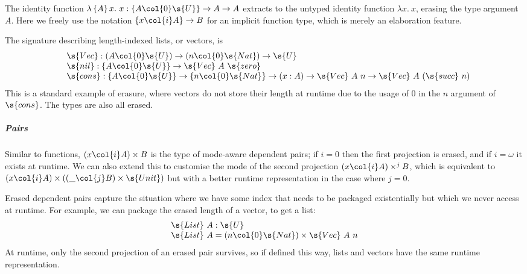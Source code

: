 \documentclass[a4paper,UKenglish,cleveref,autoref,thm-restate]{lipics-v2021}
\begin{document}
\begin{example}
 The identity function $\lambda \, \{A\} \, x.\ x : \{A \col{0} \s{U}\} \to A \to A$
  extracts to the untyped identity function $\lambda x.\ x$, erasing the type argument $A$.
  Here we freely use the notation $\{x \col{i} A\} \to B$ for an implicit
  function type, which is merely an elaboration feature.
\end{example}

\begin{example}\label{ex:vec}
The signature describing length-indexed lists, or vectors, is
\[\begin{array}{ll}
 & \s{Vec} : (A  \col{0} \s{U}) \to (n \col{0} \s{Nat}) \to \s{U} \\
 & \s{nil} : \{A  \col{0} \s{U}\} \to \s{Vec}\ A\ \s{zero} \\
 & \s{cons} : \{A \col{0} \s{U}\} \to \{n \col{0} \s{Nat}\} \to (x : A) \to \s{Vec}\ A\ n \to \s{Vec}\ A\ (\s{succ}\ n) \\
\end{array}\] This is a standard example of erasure, where vectors do not store
their length at runtime due to the usage of $0$ in the $n$ argument of
$\s{cons}$. The types are also all erased.
\end{example}

\subparagraph{Pairs}\label{ssub:dep-pairs} Similar to functions, $(x \col{i} A)
\times B$ is the type of mode-aware dependent pairs; if $i = 0$ then the
first projection is erased, and if $i = \omega$ it exists at runtime.  We can also extend this to customise the mode of
the second projection $(x \col{i} A) \times^{j} B$, which is equivalent to $(x
\col{i} A) \times ((\_ \col{j} B) \times \s{Unit})$ but with a better
runtime representation in the case where $j = 0$.

\begin{example}
Erased dependent pairs capture the situation where we have some index that needs
to be packaged existentially but which we never access at runtime. For example, we can
package the erased length of a vector, to get a list:
\[\begin{array}{l}
  \s{List}\ A: \s{U} \\
  \s{List}\ A = (n \col{0} \s{Nat}) \times \s{Vec}\ A\ n \end{array} \] At
runtime, only the second projection of an erased pair survives, so if defined
this way, lists and vectors have the same runtime representation.
\end{example}
\end{document}
